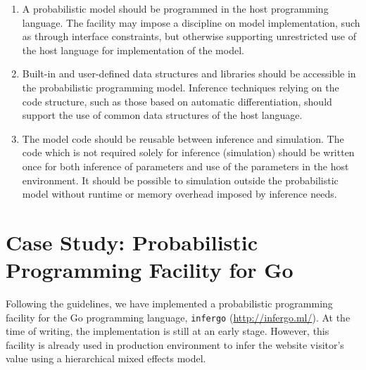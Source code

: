 \documentclass[sigplan,review]{acmart}\settopmatter{printfolios=true,printccs=false,printacmref=false}
\begin{document}
\begin{enumerate}
\item A probabilistic model should be programmed in the host
programming language. The facility may impose a discipline on
model implementation, such as through interface constraints, but
otherwise supporting unrestricted use of the host language for
implementation of the model.

\item Built-in and user-defined data structures and libraries
should be accessible in the probabilistic programming model.
Inference techniques relying on the code structure, such as
those based on automatic differentiation, should support the
use of common data structures of the host language.

\item The model code should be reusable between inference and
simulation. The code which is not required solely for inference
(simulation) should be written once for both inference of
parameters and use of the parameters in the host environment.
It should be possible to simulation outside the probabilistic
model without runtime or memory overhead imposed by inference
needs.
\end{enumerate}

\section{Case Study: Probabilistic Programming Facility for
Go}

Following the guidelines, we have implemented a probabilistic
programming facility for the Go programming language,
\texttt{infergo} (\url{http://infergo.ml/}). At the time of
writing, the implementation is still at an early stage. However,
this facility is already used in production environment to infer
the website visitor's value using a hierarchical mixed effects
model.


\end{document}
